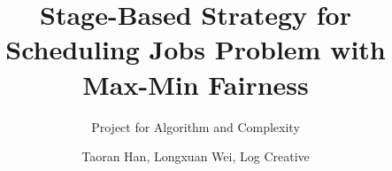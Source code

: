 \documentclass[aspectratio=169]{beamer}
\title{Stage-Based Strategy for \\ Scheduling Jobs Problem with Max-Min Fairness}
\subtitle{Project for Algorithm and Complexity }
\author{Taoran Han, Longxuan Wei, Log Creative}
\institute{Department of\\ Computer Science}
\begin{document}
    
    \makebottom
\end{document}
